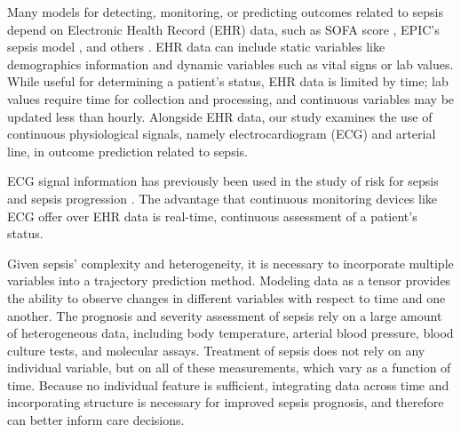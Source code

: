 Many models for detecting, monitoring, or predicting outcomes related to sepsis depend on Electronic Health Record (EHR) data, such as SOFA score \cite{sepsis-3}, EPIC's sepsis model \cite{wong_external_2021}, and others \cite{nesaragi_correlation_2021, morrill_signature_2019, taylor_prediction_2016}. EHR data can include static variables like demographics information and dynamic variables such as vital signs or lab values. While useful for determining a patient's status, EHR data is limited by time; lab values require time for collection and processing, and continuous variables may be updated less than hourly. Alongside EHR data, our study examines the use of continuous physiological signals, namely electrocardiogram (ECG) and arterial line, in outcome prediction related to sepsis. 

ECG signal information has previously been used in the study of risk for sepsis and sepsis progression \cite{berger_shock_2013, moorman_cardiovascular_2011, nemati_interpretable_2018}. The advantage that continuous monitoring devices like ECG offer over EHR data is real-time, continuous assessment of a patient's status.

Given sepsis' complexity and heterogeneity, it is necessary to incorporate multiple variables into a trajectory prediction method. Modeling data as a tensor provides the ability to observe changes in different variables with respect to time and one another. The prognosis and severity assessment of sepsis rely on a large amount of heterogeneous data, including body temperature, arterial blood pressure, blood culture tests, and molecular assays. Treatment of sepsis does not rely on any individual variable, but on all of these measurements, which vary as a function of time. Because no individual feature is sufficient, integrating data across time and incorporating structure is necessary for improved sepsis prognosis, and therefore can better inform care decisions.

